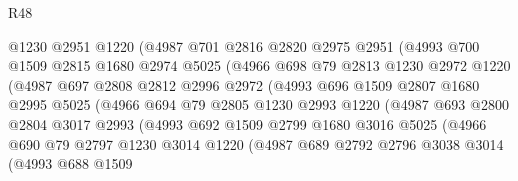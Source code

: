 \begin{lexlean}{R48}
\begin{coremodule}
                    @1230
                    @2951
                    @1220
                    (@4987
                      @701
                      @2816
                      @2820
                      @2975
                      @2951
                      (@4993
                        @700
                        @1509
                        @2815
                        @1680
                        @2974
                        @5025
                        (@4966
                          @698
                          @79
                          @2813
                          @1230
                          @2972
                          @1220
                          (@4987
                            @697
                            @2808
                            @2812
                            @2996
                            @2972
                            (@4993
                              @696
                              @1509
                              @2807
                              @1680
                              @2995
                              @5025
                              (@4966
                                @694
                                @79
                                @2805
                                @1230
                                @2993
                                @1220
                                (@4987
                                  @693
                                  @2800
                                  @2804
                                  @3017
                                  @2993
                                  (@4993
                                    @692
                                    @1509
                                    @2799
                                    @1680
                                    @3016
                                    @5025
                                    (@4966
                                      @690
                                      @79
                                      @2797
                                      @1230
                                      @3014
                                      @1220
                                      (@4987
                                        @689
                                        @2792
                                        @2796
                                        @3038
                                        @3014
                                        (@4993
                                          @688
                                          @1509

\end{coremodule}
\end{lexlean}
